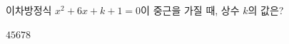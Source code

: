 이차방정식 $x^2+6x+k+1=0$이 중근을 가질 때, 상수 $k$의 값은?
\begin{choices32}{$4$}{$5$}{$6$}{$7$}{$8$}\end{choices32}
